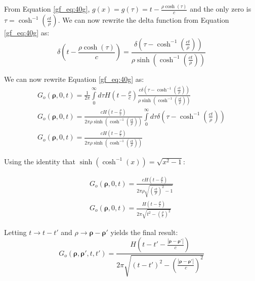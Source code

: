 From Equation \ref{gf_eq:40g}, $g(x) = g(\tau) = t - \frac{\rho\cosh(\tau)}{c}$ and the only zero  is $\tau = \cosh^{-1}\left(\frac{ct}{\rho}\right)$. We can now rewrite the delta function from Equation \ref{gf_eq:40g} as:
 \begin{equation}
\delta\left(t - \frac{\rho \cosh(\tau)}{c}\right) = \frac{\delta\left(\tau -\cosh^{-1}\left(\frac{ct}{\rho} \right) \right)}{\rho\sinh\left(\cosh^{-1}\left(\frac{ct}{\rho} \right) \right)}
\label{gf_eq:40i}
\end{equation}
 \renewcommand{\baselinestretch}{2} \small\normalsize
 
\noindent We can now rewrite Equation \ref{gf_eq:40g} as:
 \begin{equation}
 \begin{gathered}
G_o\left(\boldsymbol{\rho},0,t\right) = \frac{1}{2\pi}\int\limits_{0}^{\infty}d\tau H\left(t -\frac{\rho}{c}\right)  \frac{c\delta\left(\tau -\cosh^{-1}\left(\frac{ct}{\rho} \right) \right)}{\rho\sinh\left(\cosh^{-1}\left(\frac{ct}{\rho} \right) \right)}\\
G_o\left(\boldsymbol{\rho},0,t\right) = \frac{cH\left(t -\frac{\rho}{c}\right)}{2\pi \rho\sinh\left(\cosh^{-1}\left(\frac{ct}{\rho} \right) \right)}\int\limits_{0}^{\infty}d\tau \delta\left(\tau -\cosh^{-1}\left(\frac{ct}{\rho} \right) \right)\\
G_o\left(\boldsymbol{\rho},0,t\right) = \frac{cH\left(t -\frac{\rho}{c}\right)}{2\pi \rho\sinh\left(\cosh^{-1}\left(\frac{ct}{\rho} \right) \right)}
\end{gathered}
\label{gf_eq:40j}
\end{equation}
 \renewcommand{\baselinestretch}{2} \small\normalsize
 
\noindent Using the identity that $\sinh\left(\cosh^{-1}(x) \right) = \sqrt{x^2 -1}$:

 \begin{equation}
 \begin{gathered}
G_o\left(\boldsymbol{\rho},0,t\right) = \frac{cH\left(t -\frac{\rho}{c}\right)}{2\pi \rho\sqrt{\left(\frac{ct}{\rho} \right)^2 - 1}     }\\
G_o\left(\boldsymbol{\rho},0,t\right) = \frac{H\left(t -\frac{\rho}{c}\right)}{2\pi \sqrt{t^2 - \left(\frac{\rho}{c}\right)^2}     }
\end{gathered}
\label{gf_eq:40k}
\end{equation}
 \renewcommand{\baselinestretch}{2} \small\normalsize
 
\noindent Letting $t\rightarrow t-t'$ and $\rho \rightarrow \boldsymbol{\rho} - \boldsymbol{\rho}'$ yields the final result:
 \begin{equation}
\boxed{G_o\left(\boldsymbol{\rho},\boldsymbol{\rho}',t,t'\right) = \frac{H\left(t-t' -\frac{|\boldsymbol{\rho} - \boldsymbol{\rho}'|}{c}\right)}{2\pi \sqrt{(t-t')^2 -\left(\frac{|\boldsymbol{\rho} - \boldsymbol{\rho}'|}{c}\right)^2 }     }}
\label{gf_eq:40l}
\end{equation}
\renewcommand{\baselinestretch}{2} \small\normalsize

